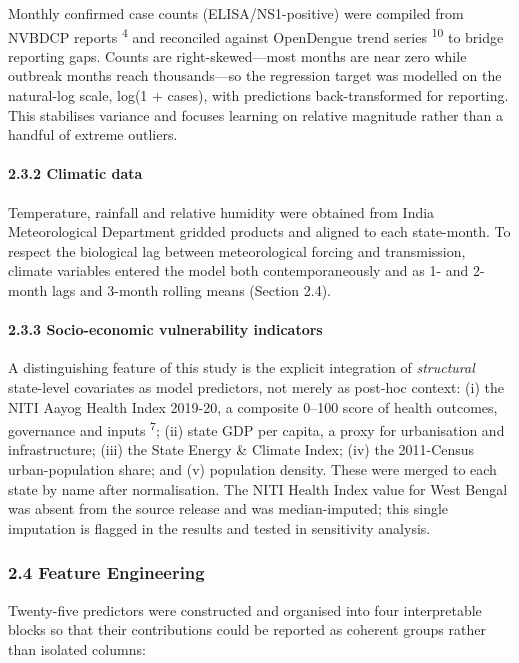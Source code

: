 \documentclass[
  10pt,
  twocolumn]{article}
\begin{document}
Monthly confirmed case counts (ELISA/NS1-positive) were compiled from
NVBDCP reports \textsuperscript{4} and reconciled against OpenDengue
trend series \textsuperscript{10} to bridge reporting gaps. Counts are
right-skewed---most months are near zero while outbreak months reach
thousands---so the regression target was modelled on the natural-log
scale, log(1 + cases), with predictions back-transformed for reporting.
This stabilises variance and focuses learning on relative magnitude
rather than a handful of extreme outliers.

\paragraph{2.3.2 Climatic data}\label{climatic-data}

Temperature, rainfall and relative humidity were obtained from India
Meteorological Department gridded products and aligned to each
state-month. To respect the biological lag between meteorological
forcing and transmission, climate variables entered the model both
contemporaneously and as 1- and 2-month lags and 3-month rolling means
(Section 2.4).

\paragraph{2.3.3 Socio-economic vulnerability
indicators}\label{socio-economic-vulnerability-indicators}

A distinguishing feature of this study is the explicit integration of
\emph{structural} state-level covariates as model predictors, not merely
as post-hoc context: (i) the NITI Aayog Health Index 2019-20, a
composite 0--100 score of health outcomes, governance and inputs
\textsuperscript{7}; (ii) state GDP per capita, a proxy for urbanisation
and infrastructure; (iii) the State Energy \& Climate Index; (iv) the
2011-Census urban-population share; and (v) population density. These
were merged to each state by name after normalisation. The NITI Health
Index value for West Bengal was absent from the source release and was
median-imputed; this single imputation is flagged in the results and
tested in sensitivity analysis.

\subsubsection{2.4 Feature Engineering}\label{feature-engineering}

Twenty-five predictors were constructed and organised into four
interpretable blocks so that their contributions could be reported as
coherent groups rather than isolated columns:
\end{document}
